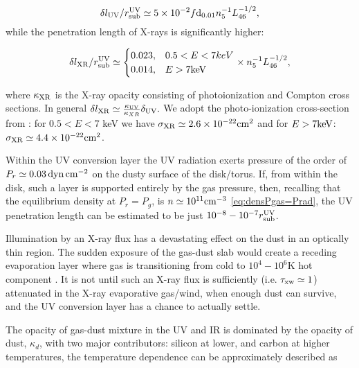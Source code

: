 \documentclass[12pt,english,preprint]{aastex}
\newcommand{\su}[2]{#1_{\rm #2}}
\newcommand{\Tsub}{ \su{T}{sub} }
\begin{document}
\begin{equation}
\delta l_{{\rm UV}}/r_{{\rm sub}}^{{\rm UV}}\simeq5\times10^{-2}f{\rm d}_{0.01}n_{5}^{-1}L_{46}^{-1/2}\mbox{,}
\label{ConversionLayerUV}
\end{equation}
while the penetration length of
X-rays is significantly higher:

\begin{equation}
\delta l_{{\rm XR}}/\su{r}{sub}^{\rm UV}\simeq\begin{cases}
0.023, & 0.5<E<7keV\\
0.014, & E>7{\rm keV}
\end{cases}\times n_{5}^{-1}L_{46}^{-1/2},\label{ConversionLayerXRay}
\end{equation}

where $\kappa_{{\rm XR}}$ is the X-ray opacity consisting of photoionization
and Compton cross sections. In general $\delta l_{{\rm XR}}\simeq\frac{\kappa_{{\rm UV}}}{\kappa_{XR}}\delta_{{\rm UV}}.$
We adopt the photo-ionization cross-section from \citep{Maloney96}: for
$0.5<E<7$ keV we have $\sigma_{{\rm XR}}\simeq2.6\times10^{-22}\text{cm}^{2}$
and for $E>7{\rm keV}$: $\sigma_{{\rm XR}}\simeq4.4\times10^{-22}\text{cm}^{2}$.

{
Within the UV conversion layer
the UV radiation exerts pressure
of the order of $P_r\simeq0.03\, {\rm dyn\,cm^{-2}}$
on the dusty surface of the disk/torus.  
If, from within the disk, such a layer is supported 
entirely by the gas pressure, then, recalling that the equilibrium density at 
$P_r=P_g$, is  $n \simeq10^{11}{\rm cm}^{-3}$ \eqref{eq:densPgas=Prad}, 
the UV penetration length can be estimated to be just $10^{-8}-10^{-7} \su{r}{sub}^{\rm UV}$.

Illumination by
an X-ray flux has a devastating effect on the dust in an optically 
thin region. The sudden exposure of the gas-dust 
slab would create a receding evaporation layer where gas is transitioning from 
cold to $10^4-10^6$K hot component \citep[i.e.][]{Dorodnitsyn08b}.
It is not until such an X-ray flux is sufficiently
(i.e. $\tau_{{\rm xw}}\simeq1$) attenuated in the X-ray evaporative
gas/wind, when enough dust can survive, and the UV conversion layer
has a chance to actually settle.
}

The opacity of gas-dust mixture in the UV and IR is dominated by the
opacity of dust, $\kappa_{d}$, with two major contributors: silicon
at lower, and carbon at higher temperatures, the temperature dependence
can be approximately described as
\end{document}
